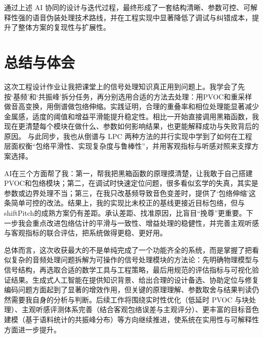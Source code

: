 \documentclass[12pt,a4paper]{article}
\begin{document}
通过上述 AI 协同的设计与迭代过程，最终形成了一套结构清晰、参数可控、可解释性强的语音伪装处理技术路线，并在工程实现中显著降低了调试与纠错成本，提升了整体方案的复现性与扩展性。

\section{总结与体会}

这次工程设计作业让我把课堂上的信号处理知识真正用到问题上。我学会了先按‘基频’和‘共振峰’拆分任务，再分别选用合适的方法去处理：用PVOC和重采样做音高变换，用倒谱做包络伸缩。实践证明，合理的重叠率和相位处理能显著减少金属感，适度的阈值和增益平滑能提升稳定性。相比一开始直接调用黑箱函数，我现在更清楚每个模块在做什么、参数如何影响结果，也更能解释成功与失败背后的原因。
与此同步，我也从倒谱与 LPC 两种方法的并行实现中学到了如何在工程层面权衡“包络平滑性、实现复杂度与鲁棒性”，并用客观指标与听感对照来支撑方案选择。

AI在三个方面帮了我：第一，帮我把黑箱函数的原理摸清楚，让我敢于自己搭建PVOC和包络模块；第二，在调试时快速定位问题，很多看似玄学的失真，其实是参数或边界处理不当；第三，在我只改基频导致音色变差时，提供了‘包络伸缩’这条简单可控的改法。结果上，我的实现比未校正的基线更接近目标包络，但与shiftPitch的成熟方案仍有差距。承认差距、找准原因，比盲目“挽尊”更重要。下一步我会重点改进包络估计的平滑与一致性、增益处理的稳健性，并完善主观听感与客观指标的联合评估，把系统做得更稳、更好用。

总体而言，这次收获最大的不是单纯完成了一个功能齐全的系统，而是掌握了把看似复杂的音频处理问题拆解为可操作的信号处理模块的方法论：先明确物理模型与信号结构，再选取合适的数学工具与工程策略，最后用规范的评估指标与可视化验证结果。生成式人工智能在提供知识背景、给出合理的设计备选、协助定位与修复编码问题方面起到了显著的增效作用，但关键的原理理解、参数取舍与结果判读仍然需要我自身的分析与判断。后续工作将围绕实时性优化（低延时 PVOC 与块处理）、主观听感评测体系完善（结合客观包络误差与主观评分）、更丰富的目标音色建模（基于语料统计的共振峰分布）等方向继续推进，使系统在实用性与可解释性方面进一步提升。
\end{document}

